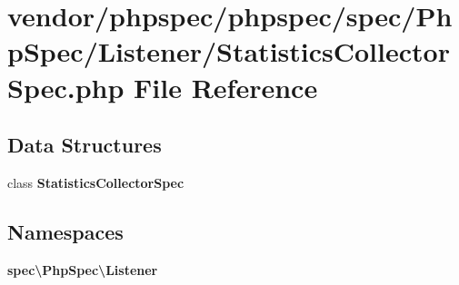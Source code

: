 \section{vendor/phpspec/phpspec/spec/\+Php\+Spec/\+Listener/\+Statistics\+Collector\+Spec.php File Reference}
\label{_statistics_collector_spec_8php}
\subsection*{Data Structures}
\begin{DoxyCompactItemize}
\item 
class {\bf Statistics\+Collector\+Spec}
\end{DoxyCompactItemize}
\subsection*{Namespaces}
\begin{DoxyCompactItemize}
\item 
 {\bf spec\textbackslash{}\+Php\+Spec\textbackslash{}\+Listener}
\end{DoxyCompactItemize}
